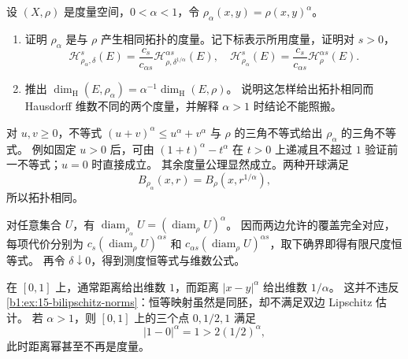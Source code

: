 \begin{optionalexercise}\label{b1:ex:15-snowflake-metric}
设 \((X,\rho)\) 是度量空间，\(0<\alpha<1\)，令
\(\rho_\alpha(x,y)=\rho(x,y)^\alpha\)。
\begin{enumerate}
\item\label{b1:item:15-snowflake-measure}
证明 \(\rho_\alpha\) 是与 \(\rho\) 产生相同拓扑的度量。记下标表示所用度量，证明对 \(s>0\)，
\[
 \mathcal H^s_{\rho_\alpha,\delta}(E)
 =\frac{c_s}{c_{\alpha s}}
   \mathcal H^{\alpha s}_{\rho,\delta^{1/\alpha}}(E),
 \quad
 \mathcal H^s_{\rho_\alpha}(E)
 =\frac{c_s}{c_{\alpha s}}\mathcal H^{\alpha s}_{\rho}(E).
\]
\item\label{b1:item:15-snowflake-dimension}
推出 \(\dim_{\mathrm H}(E,\rho_\alpha)=\alpha^{-1}\dim_{\mathrm H}(E,\rho)\)。
说明这怎样给出拓扑相同而 Hausdorff 维数不同的两个度量，并解释 \(\alpha>1\) 时结论不能照搬。
\end{enumerate}
\end{optionalexercise}
\begin{solution}
对 \(u,v\ge0\)，不等式 \((u+v)^\alpha\le u^\alpha+v^\alpha\) 与 \(\rho\) 的三角不等式给出 \(\rho_\alpha\) 的三角不等式。
例如固定 \(u>0\) 后，可由 \((1+t)^\alpha-t^\alpha\) 在 \(t>0\) 上递减且不超过 \(1\) 验证前一不等式；\(u=0\) 时直接成立。
其余度量公理显然成立。两种开球满足
\[
 B_{\rho_\alpha}(x,r)=B_\rho(x,r^{1/\alpha}),
\]
所以拓扑相同。

对任意集合 \(U\)，有
\(\operatorname{diam}_{\rho_\alpha}U=(\operatorname{diam}_\rho U)^\alpha\)。
因而两边允许的覆盖完全对应，每项代价分别为
\(c_s(\operatorname{diam}_\rho U)^{\alpha s}\) 和
\(c_{\alpha s}(\operatorname{diam}_\rho U)^{\alpha s}\)，取下确界即得有限尺度恒等式。
再令 \(\delta\downarrow0\)，得到测度恒等式与维数公式。

在 \([0,1]\) 上，通常距离给出维数 \(1\)，而距离 \(|x-y|^\alpha\) 给出维数 \(1/\alpha\)。
这并不违反\cref{b1:ex:15-bilipschitz-norms}：恒等映射虽然是同胚，却不满足双边 Lipschitz 估计。
若 \(\alpha>1\)，则 \([0,1]\) 上的三个点 \(0,1/2,1\) 满足
\[
 |1-0|^\alpha=1>2(1/2)^\alpha,
\]
此时距离幂甚至不再是度量。
\end{solution}

